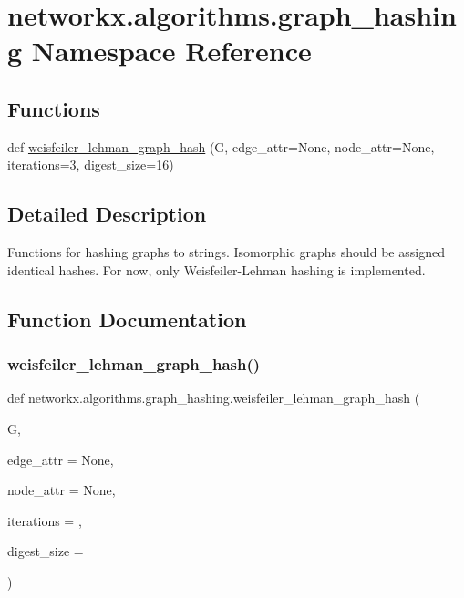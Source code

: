 \hypertarget{namespacenetworkx_1_1algorithms_1_1graph__hashing}{}\section{networkx.\+algorithms.\+graph\+\_\+hashing Namespace Reference}
\label{namespacenetworkx_1_1algorithms_1_1graph__hashing}
\subsection*{Functions}
\begin{DoxyCompactItemize}
\item 
def \hyperlink{namespacenetworkx_1_1algorithms_1_1graph__hashing_a0c046e2472e546d677811ac072162269}{weisfeiler\+\_\+lehman\+\_\+graph\+\_\+hash} (G, edge\+\_\+attr=None, node\+\_\+attr=None, iterations=3, digest\+\_\+size=16)
\end{DoxyCompactItemize}


\subsection{Detailed Description}
\begin{DoxyVerb}Functions for hashing graphs to strings.
Isomorphic graphs should be assigned identical hashes.
For now, only Weisfeiler-Lehman hashing is implemented.
\end{DoxyVerb}
 

\subsection{Function Documentation}
\mbox{\label{namespacenetworkx_1_1algorithms_1_1graph__hashing_a0c046e2472e546d677811ac072162269}} 
\subsubsection{\texorpdfstring{weisfeiler\+\_\+lehman\+\_\+graph\+\_\+hash()}{weisfeiler\_lehman\_graph\_hash()}}
{\footnotesize\ttfamily def networkx.\+algorithms.\+graph\+\_\+hashing.\+weisfeiler\+\_\+lehman\+\_\+graph\+\_\+hash (\begin{DoxyParamCaption}\item[{}]{G,  }\item[{}]{edge\+\_\+attr = {\ttfamily None},  }\item[{}]{node\+\_\+attr = {\ttfamily None},  }\item[{}]{iterations = {},  }\item[{}]{digest\+\_\+size = {} }\end{DoxyParamCaption})}

